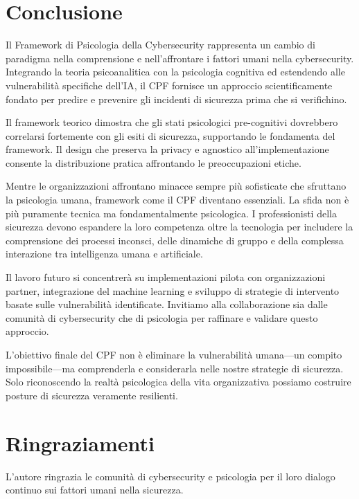 \documentclass[11pt,a4paper]{article}
\begin{document}
\section{Conclusione}

Il Framework di Psicologia della Cybersecurity rappresenta un cambio di paradigma nella comprensione e nell'affrontare i fattori umani nella cybersecurity. Integrando la teoria psicoanalitica con la psicologia cognitiva ed estendendo alle vulnerabilità specifiche dell'IA, il CPF fornisce un approccio scientificamente fondato per predire e prevenire gli incidenti di sicurezza prima che si verifichino.

Il framework teorico dimostra che gli stati psicologici pre-cognitivi dovrebbero correlarsi fortemente con gli esiti di sicurezza, supportando le fondamenta del framework. Il design che preserva la privacy e agnostico all'implementazione consente la distribuzione pratica affrontando le preoccupazioni etiche.

Mentre le organizzazioni affrontano minacce sempre più sofisticate che sfruttano la psicologia umana, framework come il CPF diventano essenziali. La sfida non è più puramente tecnica ma fondamentalmente psicologica. I professionisti della sicurezza devono espandere la loro competenza oltre la tecnologia per includere la comprensione dei processi inconsci, delle dinamiche di gruppo e della complessa interazione tra intelligenza umana e artificiale.

Il lavoro futuro si concentrerà su implementazioni pilota con organizzazioni partner, integrazione del machine learning e sviluppo di strategie di intervento basate sulle vulnerabilità identificate. Invitiamo alla collaborazione sia dalle comunità di cybersecurity che di psicologia per raffinare e validare questo approccio.

L'obiettivo finale del CPF non è eliminare la vulnerabilità umana---un compito impossibile---ma comprenderla e considerarla nelle nostre strategie di sicurezza. Solo riconoscendo la realtà psicologica della vita organizzativa possiamo costruire posture di sicurezza veramente resilienti.

\section*{Ringraziamenti}

L'autore ringrazia le comunità di cybersecurity e psicologia per il loro dialogo continuo sui fattori umani nella sicurezza.
\end{document}
